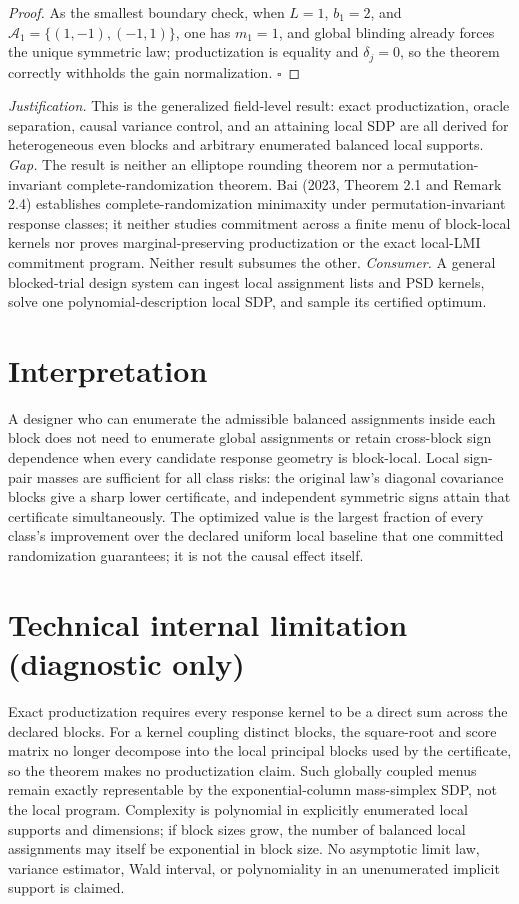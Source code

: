 \documentclass{article}
\begin{document}
\begin{proof}
As the smallest boundary check, when \(L=1\), \(b_1=2\), and \(\mathcal A_1=\{(1,-1),(-1,1)\}\), one has \(m_1=1\), and global blinding already forces the unique symmetric law; productization is equality and \(\delta_j=0\), so the theorem correctly withholds the gain normalization. \(\square\)
\end{proof}
\par\smallskip\noindent \textit{Justification.} This is the generalized field-level result: exact productization, oracle separation, causal variance control, and an attaining local SDP are all derived for heterogeneous even blocks and arbitrary enumerated balanced local supports. \textit{Gap.} The result is neither an elliptope rounding theorem nor a permutation-invariant complete-randomization theorem. Bai (2023, Theorem 2.1 and Remark 2.4) establishes complete-randomization minimaxity under permutation-invariant response classes; it neither studies commitment across a finite menu of block-local kernels nor proves marginal-preserving productization or the exact local-LMI commitment program. Neither result subsumes the other. \textit{Consumer.} A general blocked-trial design system can ingest local assignment lists and PSD kernels, solve one polynomial-description local SDP, and sample its certified optimum.

\section{Interpretation}

A designer who can enumerate the admissible balanced assignments inside each block does not need to enumerate global assignments or retain cross-block sign dependence when every candidate response geometry is block-local. Local sign-pair masses are sufficient for all class risks: the original law's diagonal covariance blocks give a sharp lower certificate, and independent symmetric signs attain that certificate simultaneously. The optimized value is the largest fraction of every class's improvement over the declared uniform local baseline that one committed randomization guarantees; it is not the causal effect itself.

\section*{Technical internal limitation (diagnostic only)}

Exact productization requires every response kernel to be a direct sum across the declared blocks. For a kernel coupling distinct blocks, the square-root and score matrix no longer decompose into the local principal blocks used by the certificate, so the theorem makes no productization claim. Such globally coupled menus remain exactly representable by the exponential-column mass-simplex SDP, not the local program. Complexity is polynomial in explicitly enumerated local supports and dimensions; if block sizes grow, the number of balanced local assignments may itself be exponential in block size. No asymptotic limit law, variance estimator, Wald interval, or polynomiality in an unenumerated implicit support is claimed.
\end{document}
